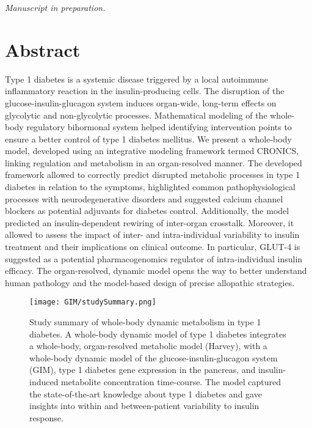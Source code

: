 { \textit{Manuscript in preparation.} \par}%
\section*{Abstract}
{  
Type 1 diabetes is a systemic disease triggered by a local autoimmune inflammatory reaction in the insulin-producing cells. The disruption of the glucose-insulin-glucagon system induces organ-wide, long-term effects on glycolytic and non-glycolytic processes. Mathematical modeling of the whole-body regulatory bihormonal system helped identifying intervention points to ensure a better control of type 1 diabetes mellitus. We present a whole-body model, developed using an integrative modeling framework termed CRONICS, linking regulation and metabolism in an organ-resolved manner. The developed framework allowed to correctly predict disrupted metabolic processes in type 1 diabetes in relation to the symptoms, highlighted common pathophysiological processes with neurodegenerative disorders and suggested calcium channel blockers as potential adjuvants for diabetes control. Additionally, the model predicted an insulin-dependent rewiring of inter-organ crosstalk. Moreover, it allowed to assess the impact of inter- and intra-individual variability to insulin treatment and their implications on clinical outcome. In particular, GLUT-4 is suggested as a potential pharmacogenomics regulator of intra-individual insulin efficacy. The organ-resolved, dynamic model opens the way to better understand human pathology and the model-based design of precise allopathic strategies.
\par}%

\newpage
\begin{figure}[!htp]
\centering
	\texttt{[image: GIM/studySummary.png]}%
	\caption[Study summary of whole-body dynamic metabolism.]{Study summary of whole-body dynamic metabolism in type 1 diabetes. A whole-body dynamic model of type 1 diabetes integrates a whole-body, organ-resolved metabolic model (Harvey), with a whole-body dynamic model of the glucose-insulin-glucagon system (GIM), type 1 diabetes gene expression in the pancreas, and insulin-induced metabolite concentration time-course. The model captured the state-of-the-art knowledge about type 1 diabetes and gave insights into within and between-patient variability to insulin response.}
	\label{fig:GIMSummary}
\end{figure}

